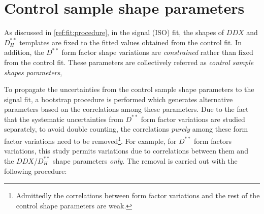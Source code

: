 \section{Control sample shape parameters}
\label{sys-model-ctrl}

As discussed in \cref{ref:fit:procedure},
in the signal (ISO) fit,
the shapes of $DDX$ and $D^{**}_H$ templates
are fixed to the fitted values obtained from the control fit.
In addition, the $D^{**}$ form factor shape variations are \emph{constrained}
rather than fixed from the control fit.
These parameters are collectively referred as
\emph{control sample shapes parameters},

To propagate the uncertainties from the control sample shape parameters to
the signal fit,
a bootstrap procedure is performed which generates alternative parameters based
on the correlations among these parameters.
Due to the fact that the systematic uncertainties from $D^{**}$ form factor
variations are studied separately,
to avoid double counting,
the correlations \emph{purely} among these form factor variations need to be
removed\footnote{
    Admittedly the correlations between form factor variations and the rest of
    the control shape parameters are weak.
}.
For example, for $D^{**}$ form factors variations,
this study permits variations due to
correlations between them and the $DDX$/$D^{**}_H$ shape parameters \emph{only}.
The removal is carried out with the following procedure:

